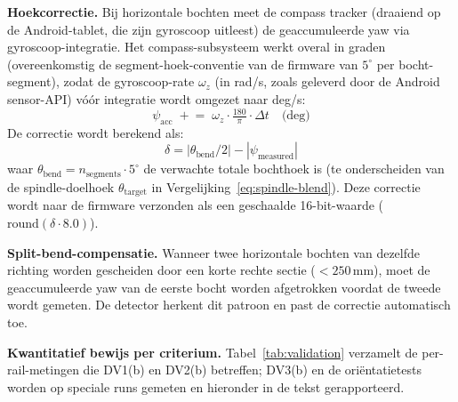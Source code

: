 \documentclass[10pt, a4paper, twocolumn]{article}
\begin{document}
\textbf{Hoekcorrectie.} Bij horizontale bochten meet de compass tracker
(draaiend op de Android-tablet, die zijn gyroscoop uitleest) de geaccumuleerde
yaw via gyroscoop-integratie. Het compass-subsysteem werkt overal in graden
(overeenkomstig de segment-hoek-conventie van de firmware van $5^\circ$ per
bocht-segment), zodat de gyroscoop-rate $\omega_z$ (in rad/s, zoals geleverd
door de Android sensor-API) vóór integratie wordt omgezet naar deg/s:
\begin{equation}
\label{eq:compass}
\psi_{\text{acc}}\;\mathrel{+}=\;\omega_z \cdot \tfrac{180}{\pi} \cdot \Delta t
\quad\text{(deg)}
\end{equation}
De correctie wordt berekend als:
\begin{equation}
\label{eq:anglecorrection}
\delta = |\theta_{\text{bend}}/2| - |\psi_{\text{measured}}|
\end{equation}
waar $\theta_{\text{bend}} = n_{\text{segments}} \cdot 5^\circ$ de
verwachte totale bochthoek is (te onderscheiden van de spindle-doelhoek
$\theta_{\text{target}}$ in Vergelijking~\ref{eq:spindle-blend}). Deze correctie wordt naar de firmware verzonden als een
geschaalde 16-bit-waarde ($\text{round}(\delta \cdot 8.0)$).

\textbf{Split-bend-compensatie.} Wanneer twee horizontale bochten van dezelfde
richting worden gescheiden door een korte rechte sectie ($<250$\,mm), moet de
geaccumuleerde yaw van de eerste bocht worden afgetrokken voordat de tweede
wordt gemeten. De detector herkent dit patroon en past de correctie automatisch
toe.

\textbf{Kwantitatief bewijs per criterium.} Tabel~\ref{tab:validation}
verzamelt de per-rail-metingen die DV1(b) en DV2(b) betreffen; DV3(b) en de
oriëntatietests worden op speciale runs gemeten en hieronder in de tekst
gerapporteerd.
\end{document}
